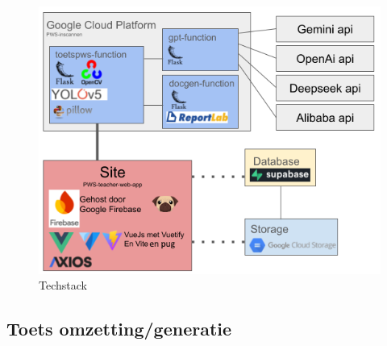 \documentclass[12pt]{article}
\begin{document}
\begin{figure}[H]
    \centering
    \includegraphics[width=\linewidth]{./images/demo/stack.png}
    \caption{Techstack}
    \label{fig:tech-stack}
\end{figure}

\pagebreak
\subsection{Toets omzetting/generatie}
\end{document}
